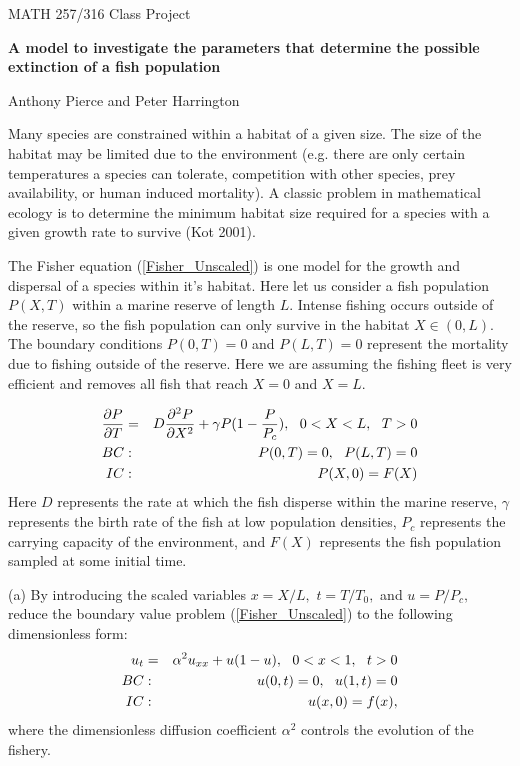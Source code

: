 \documentclass[12pt]{article}
\begin{document}
\pagestyle{empty}

\begin{center}
{\Large MATH 257/316 Class Project}\textbf{\ \\[0pt]
}



\textbf{A model to investigate the parameters that determine the possible
extinction of a fish population}

Anthony Pierce and Peter Harrington
\end{center}


Many species are constrained within a habitat of a given size. The size of the habitat may be limited due to the environment (e.g. there are only certain temperatures a species can tolerate, competition with other species, prey availability, or human induced mortality). A classic problem in mathematical ecology is to determine the minimum habitat size required for a species with a given growth rate to survive (Kot 2001).


The Fisher equation (\ref{Fisher_Unscaled}) is one model for the growth and dispersal of a species within it's habitat. Here let us consider a fish population $P(X,T)$ within a marine reserve of length $L$. Intense fishing occurs outside of the reserve, so the fish population can only survive in the habitat $X\in (0,L)$. The boundary conditions $P(0,T)=0$ and $P(L,T)=0$ represent the mortality due to fishing outside of the reserve. Here we are assuming the fishing fleet is very efficient and removes all fish that reach $X=0$ and $X=L$.


\begin{eqnarray}
\frac{\partial P}{\partial T} &=&D\frac{\partial ^{2}P}{\partial X^{2}}%
+\gamma P(1-\frac{P}{P_c}),~~0<X<L,~~T>0  \label{Fisher_Unscaled} \\
BC &:&P(0,T)=0,\text{ \ }P(L,T)=0  \notag \\
IC &:&P(X,0)=F(X)  \notag
\end{eqnarray}%
Here $D$ represents the rate at which the fish disperse within the marine reserve, $\gamma $ represents the birth rate of the fish at low population densities, $P_c$ represents the carrying capacity of the environment, and $F(X)$ represents the fish population sampled at some initial time.

(a) By introducing the scaled variables $x=X/L,$ $t=T/T_{0},$ and $%
u=P/P_c, $ reduce the boundary value problem (\ref{Fisher_Unscaled}) to
the following dimensionless form: 
\begin{eqnarray}
u_{t} &=&\alpha ^{2}u_{xx}+u(1-u),~~0<x<1,~~t>0  \label{Fisher} \\
BC &:&u(0,t)=0,\text{ \ }u(1,t)=0  \notag \\
IC &:&u(x,0)=f(x),  \notag
\end{eqnarray}%
where the dimensionless diffusion coefficient $\alpha ^{2}$ controls the
evolution of the fishery.
\end{document}
